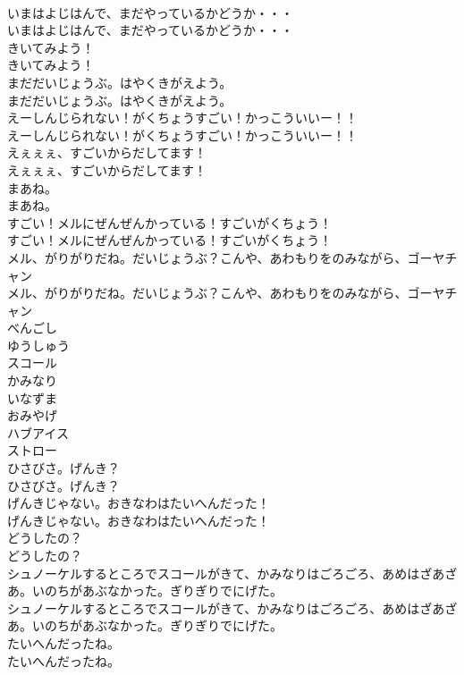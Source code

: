 \documentclass[8pt]{extreport}
\begin{document}
\begin{CJK}{UTF8}{min}
\\	いまはよじはんで、まだやっているかどうか・・・
\\	いまはよじはんで、まだやっているかどうか・・・
\\	きいてみよう！
\\	きいてみよう！
\\	まだだいじょうぶ。はやくきがえよう。
\\	まだだいじょうぶ。はやくきがえよう。
\\	えーしんじられない！がくちょうすごい！かっこういいー！！
\\	えーしんじられない！がくちょうすごい！かっこういいー！！
\\	えぇぇぇ、すごいからだしてます！
\\	えぇぇぇ、すごいからだしてます！
\\	まあね。
\\	まあね。
\\	すごい！メルにぜんぜんかっている！すごいがくちょう！
\\	すごい！メルにぜんぜんかっている！すごいがくちょう！
\\	メル、がりがりだね。だいじょうぶ？こんや、あわもりをのみながら、ゴーヤチャン
\\	メル、がりがりだね。だいじょうぶ？こんや、あわもりをのみながら、ゴーヤチャン
\\	べんごし
\\	ゆうしゅう
\\	スコール
\\	かみなり
\\	いなずま
\\	おみやげ
\\	ハブアイス
\\	ストロー
\\	ひさびさ。げんき？
\\	ひさびさ。げんき？
\\	げんきじゃない。おきなわはたいへんだった！
\\	げんきじゃない。おきなわはたいへんだった！
\\	どうしたの？
\\	どうしたの？
\\	シュノーケルするところでスコールがきて、かみなりはごろごろ、あめはざあざあ。いのちがあぶなかった。ぎりぎりでにげた。
\\	シュノーケルするところでスコールがきて、かみなりはごろごろ、あめはざあざあ。いのちがあぶなかった。ぎりぎりでにげた。
\\	たいへんだったね。
\\	たいへんだったね。

\end{CJK}
\end{document}
